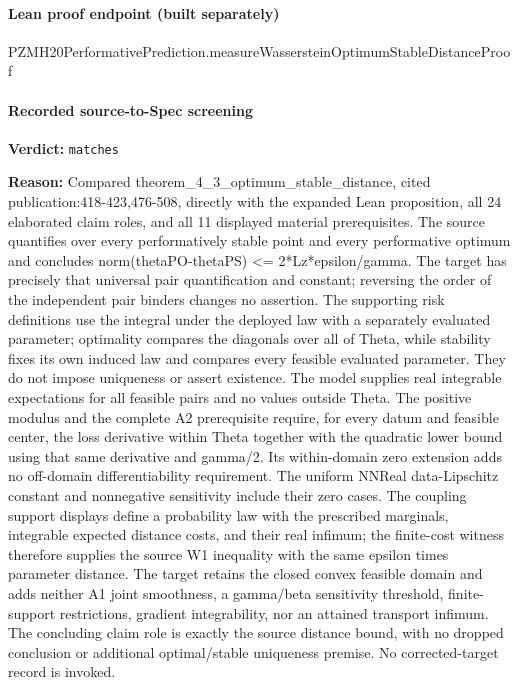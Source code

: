 \documentclass[10pt]{article}
\begin{document}
\paragraph{Lean proof endpoint (built separately)}\begin{ReviewVerbatim}
PZMH20PerformativePrediction.measureWassersteinOptimumStableDistanceProof
\end{ReviewVerbatim}

\paragraph{Recorded source-to-Spec screening}
\textbf{Verdict:} \texttt{matches}
\\
{\raggedright
\textbf{Reason:} Compared theorem\_\allowbreak{}4\_\allowbreak{}3\_\allowbreak{}optimum\_\allowbreak{}stable\_\allowbreak{}distance, cited publication:\allowbreak{}418-\allowbreak{}423,476-\allowbreak{}508, directly with the expanded Lean proposition, all 24 elaborated claim roles, and all 11 displayed material prerequisites.\allowbreak{} The source quantifies over every performatively stable point and every performative optimum and concludes norm(thetaPO-\allowbreak{}thetaPS) <= 2*Lz*epsilon/\allowbreak{}gamma.\allowbreak{} The target has precisely that universal pair quantification and constant;\allowbreak{} reversing the order of the independent pair binders changes no assertion.\allowbreak{} The supporting risk definitions use the integral under the deployed law with a separately evaluated parameter;\allowbreak{} optimality compares the diagonals over all of Theta, while stability fixes its own induced law and compares every feasible evaluated parameter.\allowbreak{} They do not impose uniqueness or assert existence.\allowbreak{} The model supplies real integrable expectations for all feasible pairs and no values outside Theta.\allowbreak{} The positive modulus and the complete A2 prerequisite require, for every datum and feasible center, the loss derivative within Theta together with the quadratic lower bound using that same derivative and gamma/\allowbreak{}2.\allowbreak{} Its within-\allowbreak{}domain zero extension adds no off-\allowbreak{}domain differentiability requirement.\allowbreak{} The uniform NNReal data-\allowbreak{}Lipschitz constant and nonnegative sensitivity include their zero cases.\allowbreak{} The coupling support displays define a probability law with the prescribed marginals, integrable expected distance costs, and their real infimum;\allowbreak{} the finite-\allowbreak{}cost witness therefore supplies the source W1 inequality with the same epsilon times parameter distance.\allowbreak{} The target retains the closed convex feasible domain and adds neither A1 joint smoothness, a gamma/\allowbreak{}beta sensitivity threshold, finite-\allowbreak{}support restrictions, gradient integrability, nor an attained transport infimum.\allowbreak{} The concluding claim role is exactly the source distance bound, with no dropped conclusion or additional optimal/\allowbreak{}stable uniqueness premise.\allowbreak{} No corrected-\allowbreak{}target record is invoked.\allowbreak{}
\par}
\end{document}

